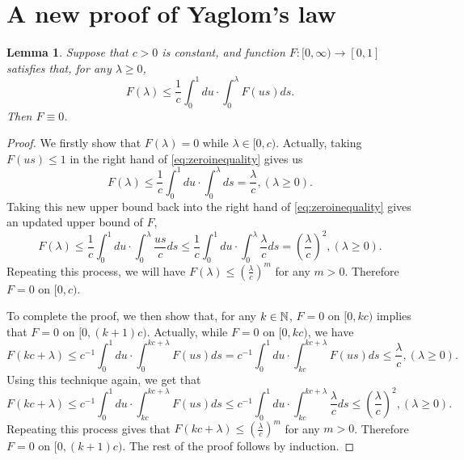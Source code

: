 \documentclass[12pt]{amsart}
\newtheorem{lem}[thm]{Lemma}
\theoremstyle{remark}
\numberwithin{equation}{section}
\newcommand{\expr}[1]{\left( #1 \right)}
\begin{document}
\section{A new proof of Yaglom's law}
\label{sec:anewproofofyaglomslaw}
\begin{lem}
\label{lem:zeroinequality}
    Suppose that $c>0$ is constant, and function $F:[0,\infty)\to [0,1]$ satisfies that, for any $\lambda\geq 0$,
\begin{equation}
\label{eq:zeroinequality}
	    F(\lambda)
	\leq 
	    \frac{1}{c}\int_0^1du
	\cdot 
	    \int_0^\lambda F(us)ds.
\end{equation}
    Then $F\equiv 0$.
\end{lem}
\begin{proof}
    We firstly show that $F(\lambda)=0$ while $\lambda \in [0,c)$. Actually, taking $F(us)\leq 1$ in the right hand of \eqref{eq:zeroinequality} gives us
\begin{equation*}
        F(\lambda)
    \leq 
        \frac{1}{c}\int_0^1du
    \cdot 
	    \int_0^\lambda ds
	=
	    \frac{\lambda}{c}
	, (\lambda\geq 0).
\end{equation*}
    Taking this new upper bound back into the right hand of \eqref{eq:zeroinequality} gives an updated upper bound of $F$,
\begin{equation*}
        F(\lambda)
    \leq 
        \frac{1}{c}\int_0^1du
    \cdot 
	    \int_0^\lambda \frac{us}{c}ds
	\leq 
        \frac{1}{c}\int_0^1du
    \cdot 
	    \int_0^\lambda \frac{\lambda}{c}ds
	=
	    \expr{\frac{\lambda}{c}}^2
	, (\lambda\geq 0).
\end{equation*}
    Repeating this process, we will have $F(\lambda)\leq (\frac{\lambda}{c})^m$ for any $m>0$. Therefore $F=0$ on $[0,c)$.
\par
    To complete the proof, we then show that, for any $k\in\mathbb N$, $F=0$ on $[0,kc)$ implies that $F=0$ on $[0,(k+1)c)$. Actually, while $F=0$ on $[0,kc)$, we have
\begin{equation*}
	    F\expr{kc+\lambda}
	\leq 
	    c^{-1}\int_0^1 du\cdot\int_0^{kc+\lambda}F(us)ds
	=
	    c^{-1}\int_0^1du\cdot\int_{kc}^{kc+\lambda} F(us)ds\leq\frac{\lambda}{c}
	,(\lambda\geq 0).
\end{equation*}
	Using this technique again, we get that
\begin{equation*}
	    F(kc+\lambda)
	\leq
	    c^{-1}\int_0^1du\cdot\int_{kc}^{kc+\lambda} F(us)ds
	\leq
	    c^{-1}\int_0^1du\cdot\int_{kc}^{kc+\lambda} \frac{\lambda}{c}ds
	\leq\expr{\frac{\lambda}{c}}^2
    ,(\lambda\geq 0).
\end{equation*}
	Repeating this process gives that $F(kc+\lambda)\leq (\frac{\lambda}{c})^m$ for any $m>0$. Therefore $F=0$ on $[0,(k+1)c)$. The rest of the proof follows by induction.
\end{proof}
\end{document}
